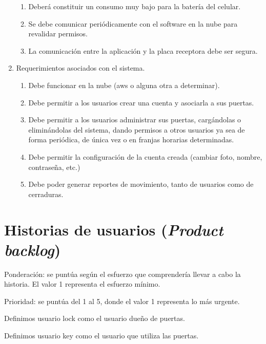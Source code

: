 \documentclass[11pt]{charter}
\begin{document}
\begin{enumerate}
\begin{enumerate}
	\item Deberá constituir un consumo muy bajo para la batería del celular.
	\item Se debe comunicar periódicamente con el software en la nube para revalidar permisos.
	\item La comunicación entre la aplicación y la placa receptora debe ser segura.
	\end{enumerate}
\item Requerimientos asociados con el sistema.
	\begin{enumerate}
	\item Debe funcionar en la nube (aws o alguna otra a determinar).
	\item Debe permitir a los usuarios crear una cuenta y asociarla a sus puertas.
	\item Debe permitir a los usuarios administrar sus puertas, cargándolas o eliminándolas del sistema, dando permisos a otros usuarios ya sea de forma periódica, de única vez o en franjas horarias determinadas.
	\item Debe permitir la configuración de la cuenta creada (cambiar foto, nombre, contraseña, etc.)
	\item Debe poder generar reportes de movimiento, tanto de usuarios como de cerraduras.
	\end{enumerate}
\end{enumerate}


\section{Historias de usuarios (\textit{Product backlog})}
\label{sec:backlog}

Ponderación: se puntúa según el esfuerzo que comprendería llevar a cabo la historia. El valor 1 representa el esfuerzo mínimo.

Prioridad: se puntúa del 1 al 5, donde el valor 1 representa lo más urgente.

Definimos usuario lock como el usuario dueño de puertas.

Definimos usuario key como el usuario que utiliza las puertas.
\end{document}
